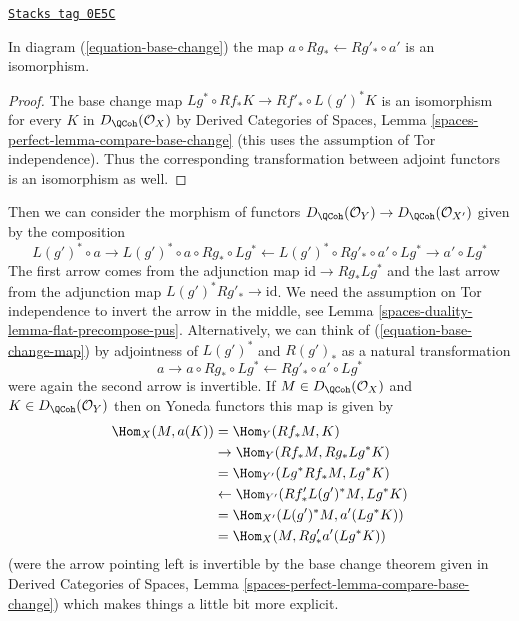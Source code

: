\begin{lemma}
\label{spaces-duality-lemma-flat-precompose-pus}
\href{https://stacks.math.columbia.edu/tag/0E5C}{\texttt{Stacks tag 0E5C}}

In diagram (\ref{equation-base-change}) the map
$a \circ Rg_* \leftarrow Rg'_* \circ a'$ is an isomorphism.
\end{lemma}

\begin{proof}
The base change map $Lg^* \circ Rf_* K \to Rf'_* \circ L(g')^*K$
is an isomorphism for every $K$ in $D_\QCoh(\mathcal{O}_X)$ by
Derived Categories of Spaces, Lemma
\ref{spaces-perfect-lemma-compare-base-change}
(this uses the assumption of Tor independence).
Thus the corresponding transformation between adjoint functors
is an isomorphism as well.
\end{proof}

Then we can consider the
morphism of functors
$D_\QCoh(\mathcal{O}_Y) \to D_\QCoh(\mathcal{O}_{X'})$
given by the composition
\begin{equation}
\label{equation-base-change-map}
L(g')^* \circ a \to
L(g')^* \circ a \circ Rg_* \circ Lg^* \leftarrow
L(g')^* \circ Rg'_* \circ a' \circ Lg^* \to a' \circ Lg^*
\end{equation}
The first arrow comes from the adjunction map $\text{id} \to Rg_* Lg^*$
and the last arrow from the adjunction map $L(g')^*Rg'_* \to \text{id}$.
We need the assumption on Tor independence to invert the arrow
in the middle, see Lemma \ref{spaces-duality-lemma-flat-precompose-pus}.
Alternatively, we can think of (\ref{equation-base-change-map}) by
adjointness of $L(g')^*$ and $R(g')_*$ as a natural transformation
$$
a \to a \circ Rg_* \circ Lg^* \leftarrow Rg'_* \circ a' \circ Lg^*
$$
were again the second arrow is invertible. If $M \in D_\QCoh(\mathcal{O}_X)$
and $K \in D_\QCoh(\mathcal{O}_Y)$
then on Yoneda functors this map is given by
\begin{align*}
\Hom_X(M, a(K))
& =
\Hom_Y(Rf_*M, K) \\
& \to
\Hom_Y(Rf_*M, Rg_* Lg^*K) \\
& =
\Hom_{Y'}(Lg^*Rf_*M, Lg^*K) \\
& \leftarrow
\Hom_{Y'}(Rf'_* L(g')^*M, Lg^*K) \\
& =
\Hom_{X'}(L(g')^*M, a'(Lg^*K)) \\
& =
\Hom_X(M, Rg'_*a'(Lg^*K))
\end{align*}
(were the arrow pointing left is invertible by the base
change theorem given in
Derived Categories of Spaces, Lemma
\ref{spaces-perfect-lemma-compare-base-change})
which makes things a little bit more explicit.

